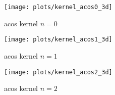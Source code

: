 \begin{figure}
    \texttt{[image: plots/kernel\_acos0\_3d]}
    \caption{acos kernel $n=0$}
    \label{fig:kernel_acos0_3d}
\end{figure}

\begin{figure}
    \texttt{[image: plots/kernel\_acos1\_3d]}
    \caption{acos kernel $n=1$}
\end{figure}

\begin{figure}
    \texttt{[image: plots/kernel\_acos2\_3d]}
    \caption{acos kernel $n=2$}
\end{figure}

%
%
%
%
%
%
%

